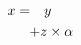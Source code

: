 \documentclass{article}
\begin{document}
\begin{eqnarray*}
x &=& y \\
& \lefteqn{\quad + z\times\alpha}
\end{eqnarray*}
\end{document}
